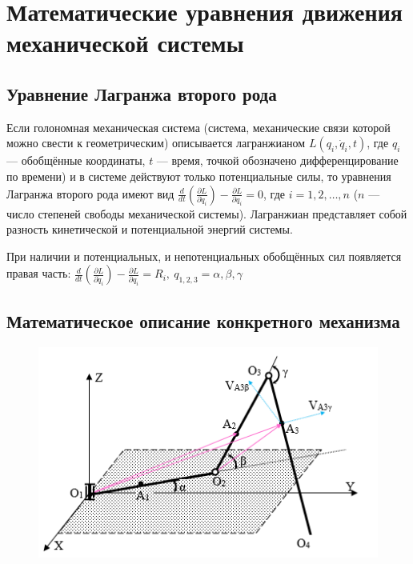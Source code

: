 \documentclass{article}
\begin{document}
\section{Математические уравнения движения механической системы}
\subsection{Уравнение Лагранжа второго рода}
Если голономная механическая система (система, механические связи которой можно свести к геометрическим) описывается лагранжианом $L(q_{i},{\dot {q}_{i}},t)$, где $q_{i}$ — обобщённые координаты, $t$ — время, точкой обозначено дифференцирование по времени) и в системе действуют только потенциальные силы, то уравнения Лагранжа второго рода имеют вид  ${\displaystyle {\frac {d}{dt}}\left({\frac {\partial L}{\partial {\dot {q}}_{i}}}\right)-{\frac {\partial L}{\partial q_{i}}}=0}$,
где $i = 1,2,\ldots,n$ ($n$ — число степеней свободы механической системы). Лагранжиан представляет собой разность кинетической и потенциальной энергий системы.

При наличии и потенциальных, и непотенциальных обобщённых сил появляется правая часть: $\displaystyle{\frac{d}{dt} (\frac{\partial L}{\partial\dot q_i})-\frac{\partial L}{\partial q_i} = R_i,\ q_{1,2,3}=\alpha,\beta,\gamma}$

\subsection{Математическое описание конкретного механизма}
\begin{figure}
    \centering
    \includegraphics[width=1\linewidth]{3d}
\end{figure}
\end{document}
